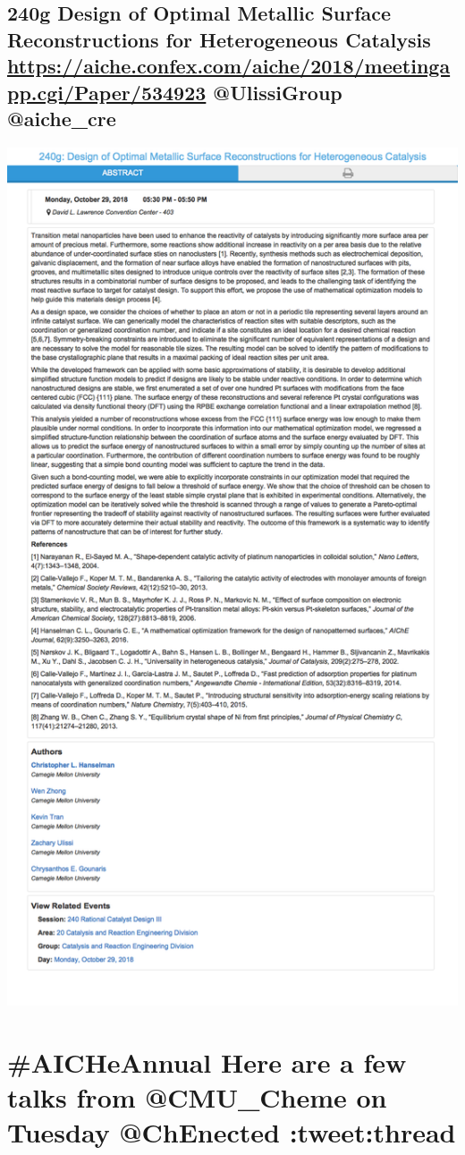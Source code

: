 \documentclass[11pt]{article}
\begin{document}
\subsection{240g Design of Optimal Metallic Surface Reconstructions for Heterogeneous Catalysis \url{https://aiche.confex.com/aiche/2018/meetingapp.cgi/Paper/534923} @UlissiGroup @aiche\_cre}
\label{sec:orgec43ff5}
\begin{center}
\includegraphics[width=.9\linewidth]{./534923.png}
\end{center}

\section{\#AICHeAnnual Here are a few talks from @CMU\_Cheme on Tuesday @ChEnected :tweet:thread}
\label{sec:org7f1b90a}
\end{document}

